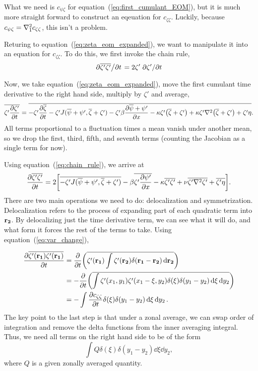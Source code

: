 \documentclass{paper}
\newcommand*{\reynolds}[1]{\mean{#1} + #1'}
\newcommand*{\mean}[1]{\overline{#1}}
\newcommand{\czz}{c_{\zeta\zeta}}
\newcommand{\cpz}{c_{\psi\zeta}}
\newcommand{\rr}[1]{\vb{r_{#1}}}
\begin{document}
What we need is $\cpz$ for equation~(\ref{eq:first_cumulant_EOM}), but it is much more straight forward to construct an eqeuation for $\czz$. Luckily, because $\cpz = \laplacian_1{\czz}$, this isn't a problem.

Returing to equation~(\ref{eq:zeta_eom_expanded}), we want to manipulate it into an equation for $\czz$. To do this, we first invoke the chain rule,
\begin{equation}
  \label{eq:chain_rule}
  \pdv*{\mean{\zeta' \zeta'}}{t} = 2\zeta'\pdv*{\zeta'}{t}
\end{equation}


Now, we take equation~(\ref{eq:zeta_eom_expanded}), move the first cumulant time derivative to the right hand side, multiply by $\zeta'$ and average,
\begin{equation}
  \label{eq:2c_eom_start}
  \mean{\zeta' \pdv{\zeta'}{t}} = \mean{-\zeta' \pdv{\mean{\zeta}}{t} - \zeta' J(\reynolds{\psi}, \reynolds{\zeta}) - \zeta' \beta \pdv{\reynolds{\psi}}{x} - \kappa \zeta' \qty(\reynolds{\zeta}) + \kappa \zeta' \laplacian{\qty(\reynolds{\zeta})} + \zeta' \eta}.
\end{equation}
All terms proportional to a fluctuation times a mean vanish under another mean, so we drop the first, third, fifth, and seventh terms (counting the Jacobian as a single term for now).

Using equation~(\ref{eq:chain_rule}), we arrive at
\begin{equation}
  \label{eq:2c_eom_jacobian}
  \pdv{\mean{\zeta' \zeta'}}{t} = 2 \qty[\mean{-\zeta' J(\reynolds{\psi}, \reynolds{\zeta})} - \beta \mean{\zeta' \pdv{\psi'}{x}} - \kappa \mean{\zeta' \zeta'} + \nu \mean{\zeta' \laplacian{\zeta'}} + \mean{\zeta' \eta}].
\end{equation}
There are two main operations we need to do: delocalization and symmetrization. Delocalization refers to the process of expanding part of each quadratic term into $\rr2$. By delocalizing just the time derivative term, we can see what it will do, and what form it forces the rest of the terms to take. Using equation~(\ref{eq:var_change}),

\begin{equation}
  \label{eq:deloaclized_dt}
  \begin{split}
    \pdv{\mean{\zeta'(\rr1) \zeta'(\rr1)}}{t} &= \pdv{t} \qty(\mean{\zeta'(\rr1) \int \zeta'(\rr2) \delta(\rr1 - \rr2) \dd{\rr2}})\\
    & = -\pdv{t} \qty(\mean{\int \zeta'(x_1, y_1) \zeta'(x_1 - \xi, y_2) \delta(\xi) \delta(y_1 - y_2) \dd{\xi} \dd{y_2}})\\
    & = -\int \pdv{\czz}{t} \delta(\xi) \delta(y_1 - y_2) \dd{\xi} \dd{y_2}.
  \end{split}
\end{equation}
The key point to the last step is that under a zonal average, we can swap order of integration and remove the delta functions from the inner averaging integral. Thus, we need all terms on the right hand side to be of the form
\begin{equation}
  \label{eq:2c_form}
  \int Q \delta(\xi) \delta(y_1 - y_2) \dd{\xi} \dd{y_2},
\end{equation}
where $Q$ is a given zonally averaged quantity.
\end{document}

